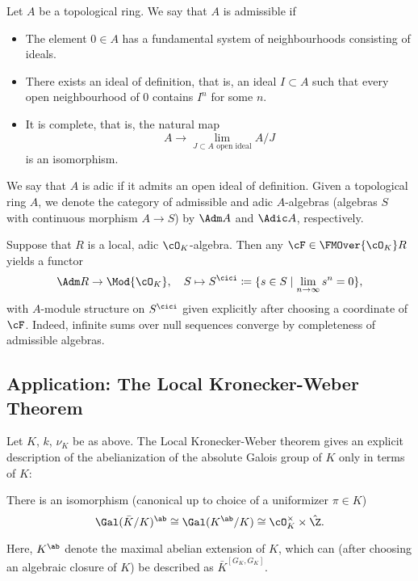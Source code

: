 \documentclass[../main.tex]{subfiles}
\begin{document}
\begin{defi}
  Let $A$ be a topological ring. We say that $A$ is admissible if
  \begin{itemize}
    \item The element $0 \in A$ has a fundamental system of neighbourhoods
      consisting of ideals.
    \item There exists an ideal of definition, that is, an ideal $I \subset A$ such
      that every open neighbourhood of $0$ contains $I^n$ for some $n$.
    \item It is complete, that is, the natural map
      \begin{equation*}
        A \to \lim_{J \subset A \text{ open ideal}} A/J
      \end{equation*}
      is an isomorphism.
  \end{itemize}
  We say that $A$ is adic if it admits an open ideal of definition.
  Given a topological ring $A$, we denote the category of admissible 
  and adic $A$-algebras (algebras $S$ with continuous morphism $A \to S$) by
  $\Adm A$ and $\Adic A$, respectively.
\end{defi}

Suppose that $R$ is a local, adic $\cO_K$-algebra. Then any $\cF \in \FMOver
{\cO_K} R$ yields a functor 
\begin{equation*}
  \Adm R \to \Mod {\cO_K}, \quad S \mapsto S^\cici \coloneqq \{s \in S \mid
  \lim_{n \to \infty} s^n = 0\},
\end{equation*}
with $A$-module structure on $S^\cici$ given explicitly after choosing a
coordinate of $\cF$. Indeed, infinite sums over null sequences converge 
by completeness of admissible algebras.



\subsection{Application: The Local Kronecker-Weber Theorem} %
\label{ssub:Formal Modules over algebraically closed fields}
Let $K$, $k$, $\nu_K$ be as above. The Local Kronecker-Weber theorem gives an explicit
description of the abelianization of the absolute Galois group of $K$ only in 
terms of $K$:

\begin{thm}\label{thm:localKW}
  There is an isomorphism (canonical up to choice of a uniformizer 
  $\pi \in K$)
  \begin{equation*}
    \Gal(\bar K/K)^\ab \cong \Gal(K^\ab/K) \cong \cO_K^\times
    \times \hat \Z.
  \end{equation*}
\end{thm}
Here, $K^\ab$ denote the maximal abelian extension of $K$, which can (after choosing
an algebraic closure of $K$) be described as $\bar K^{[G_K, G_K]}$. 
\end{document}
